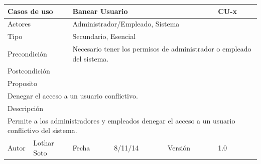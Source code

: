 \documentclass{article}
\begin{document}
\begin{table}[h]
\begin{tabular}{|l|l|l|l|l|l|}
\hline
\multicolumn{2}{|p{2cm}|}{Casos de uso}  & \multicolumn{3}{p{7cm}|}{\textbf{Banear Usuario}} & CU-x \\
\hline
\multicolumn{2}{|p{2cm}|}{Actores}       & \multicolumn{4}{p{8cm}|}{Administrador/Empleado, Sistema}        \\
\hline
\multicolumn{2}{|p{2cm}|}{Tipo}          & \multicolumn{4}{p{8cm}|}{Secundario, Esencial}        \\
\hline
\multicolumn{2}{|p{2cm}|}{Precondición}  & \multicolumn{4}{p{8cm}|}{Necesario tener los permisos de administrador o empleado del sistema.}        \\
\hline
\multicolumn{2}{|p{2cm}|}{Postcondición} & \multicolumn{4}{p{8cm}|}{}        \\
\hline
\multicolumn{6}{|p{10cm}|}{Proposito}                                   \\
\hline
\multicolumn{6}{|p{10cm}|}{Denegar el acceso a un usuario conflictivo.}                                            \\
\hline
\multicolumn{6}{|p{10cm}|}{Descripción}                                 \\
\hline
\multicolumn{6}{|p{10cm}|}{Permite a los administradores y empleados denegar el acceso a un usuario conflictivo del sistema.}                                            \\
\hline
Autor          &       Lothar Soto        & Fecha    &  8/11/14   &   Versión  & 1.0\\    
\hline
\end{tabular}
\end{table}
\end{document}
